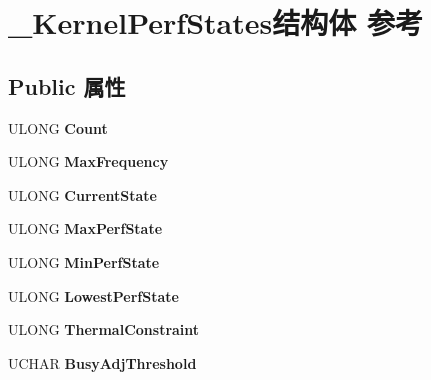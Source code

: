 \hypertarget{struct___kernel_perf_states}{}\section{\+\_\+\+Kernel\+Perf\+States结构体 参考}
\label{struct___kernel_perf_states}
\subsection*{Public 属性}
\begin{DoxyCompactItemize}
\item 
\mbox{\label{struct___kernel_perf_states_a04735f96bc5e896704aef563574a486a}} 
U\+L\+O\+NG {\bfseries Count}
\item 
\mbox{\label{struct___kernel_perf_states_a69c063bf5e696a185c9a13b17549423b}} 
U\+L\+O\+NG {\bfseries Max\+Frequency}
\item 
\mbox{\label{struct___kernel_perf_states_a353d7860e9dc59e1c7741821d9ef57b7}} 
U\+L\+O\+NG {\bfseries Current\+State}
\item 
\mbox{\label{struct___kernel_perf_states_ac8dfd39bc2cac52ba2e0625d9c7f6f69}} 
U\+L\+O\+NG {\bfseries Max\+Perf\+State}
\item 
\mbox{\label{struct___kernel_perf_states_a78503c07c5025261201761a52f4e7ffb}} 
U\+L\+O\+NG {\bfseries Min\+Perf\+State}
\item 
\mbox{\label{struct___kernel_perf_states_a232aeba2e80dd79cc1bdbba296738e96}} 
U\+L\+O\+NG {\bfseries Lowest\+Perf\+State}
\item 
\mbox{\label{struct___kernel_perf_states_a70cd389347d26998b671537f6aa22c13}} 
U\+L\+O\+NG {\bfseries Thermal\+Constraint}
\item 
\mbox{\label{struct___kernel_perf_states_a50a7aa7e3b2c6d9ee7ab8d783408fe30}} 
U\+C\+H\+AR {\bfseries Busy\+Adj\+Threshold}
\item 
\mbox{\label{struct___kernel_perf_states_a885d1ed89fff3392258f08931e1dfd46}} 

\end{DoxyCompactItemize}

